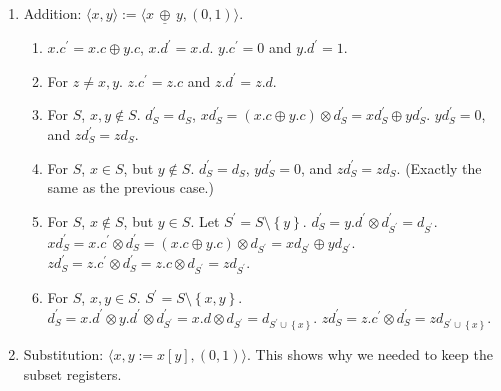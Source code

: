 \documentclass[11pt]{article}
\newcommand{\sradd}{\oplus}
\newcommand{\srmul}{\otimes}
\def\mytimes{\oplus}
\def\dadd{\,\underline\mytimes\,}
\begin{document}
\begin{enumerate}
\item Addition: $\langle x,y\rangle:=\langle x\dadd y,\left(0,1\right)\rangle$.

\begin{enumerate}
\item $x.c^{\prime}=x.c\sradd y.c$, $x.d^{\prime}=x.d$. $y.c^{\prime}=0$
and $y.d^{\prime}=1$.
\item For $z\neq x,y$. $z.c^{\prime}=z.c$ and $z.d^{\prime}=z.d$.
\item For $S$, $x,y\notin S$. $d_{S}^{\prime}=d_{S}$, $xd_{S}^{\prime}=\left(x.c\sradd y.c\right)\srmul d_{S}^{\prime}=xd_{S}^{\prime}\sradd yd_{S}^{\prime}$.
$yd_{S}^{\prime}=0$, and $zd_{S}^{\prime}=zd_{S}$.
\item For $S$, $x\in S$, but $y\notin S$. $d_{S}^{\prime}=d_{S}$, $yd_{S}^{\prime}=0$,
and $zd_{S}^{\prime}=zd_{S}$. (Exactly the same as the previous case.)
\item For $S$, $x\notin S$, but $y\in S$. Let $S^{\prime}=S\setminus\left\{ y\right\} $.
$d_{S}^{\prime}=y.d^{\prime}\srmul d_{S^{\prime}}^{\prime}=d_{S^{\prime}}$.
$xd_{S}^{\prime}=x.c^{\prime}\srmul d_{S}^{\prime}=\left(x.c\sradd y.c\right)\srmul d_{S^{\prime}}=xd_{S^{\prime}}\sradd yd_{S^{\prime}}$.
$zd_{S}^{\prime}=z.c^{\prime}\srmul d_{S}^{\prime}=z.c\srmul d_{S^{\prime}}=zd_{S^{\prime}}$.
\item For $S$, $x,y\in S$. $S^{\prime}=S\setminus\left\{ x,y\right\} $.
$d_{S}^{\prime}=x.d^{\prime}\srmul y.d^{\prime}\srmul d_{S^{\prime}}^{\prime}=x.d\srmul d_{S^{\prime}}=d_{S^{\prime}\cup\left\{ x\right\} }$.
$zd_{S}^{\prime}=z.c^{\prime}\srmul d_{S}^{\prime}=zd_{S^{\prime}\cup\left\{ x\right\} }$.
\end{enumerate}
\item Substitution: $\langle x,y:=x\left[y\right],\left(0,1\right)\rangle$. This shows why we needed to keep the subset
registers.


\end{enumerate}
\end{document}
